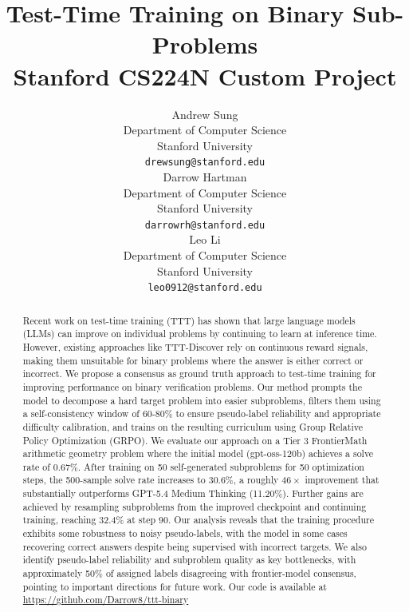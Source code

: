 \documentclass{article}
\title{
    Test-Time Training on Binary Sub-Problems\\
  \vspace{1em}
  \small{\normalfont Stanford CS224N Custom Project}  %
}
\author{
  Andrew Sung \\
  Department of Computer Science \\
  Stanford University \\
  \texttt{drewsung@stanford.edu} \\
  \And
  Darrow Hartman \\
  Department of Computer Science \\
  Stanford University \\
  \texttt{darrowrh@stanford.edu} \\
  \And
  Leo Li \\
  Department of Computer Science \\
  Stanford University \\
  \texttt{leo0912@stanford.edu}
}
\begin{document}
\maketitle
 
\begin{abstract}
Recent work on test-time training (TTT) has shown that large language models (LLMs) can improve on individual problems by continuing to learn at inference time. However, existing approaches like TTT-Discover rely on continuous reward signals, making them unsuitable for binary problems where the answer is either correct or incorrect. We propose a consensus as ground truth approach to test-time training for improving performance on binary verification problems. Our method prompts the model to decompose a hard target problem into easier subproblems, filters them using a self-consistency window of 60-80\% to ensure pseudo-label reliability and appropriate difficulty calibration, and trains on the resulting curriculum using Group Relative Policy Optimization (GRPO). We evaluate our approach on a Tier 3 FrontierMath arithmetic geometry problem where the initial model (gpt-oss-120b) achieves a solve rate of 0.67\%. After training on 50 self-generated subproblems for 50 optimization steps, the 500-sample solve rate increases to 30.6\%, a roughly $46\times$ improvement that substantially outperforms GPT-5.4 Medium Thinking (11.20\%). Further gains are achieved by resampling subproblems from the improved checkpoint and continuing training, reaching 32.4\% at step 90. Our analysis reveals that the training procedure exhibits some robustness to noisy pseudo-labels, with the model in some cases recovering correct answers despite being supervised with incorrect targets. We also identify pseudo-label reliability and subproblem quality as key bottlenecks, with approximately 50\% of assigned labels disagreeing with frontier-model consensus, pointing to important directions for future work. Our code is available at \url{https://github.com/Darrow8/ttt-binary}
\end{abstract}
\end{document}
